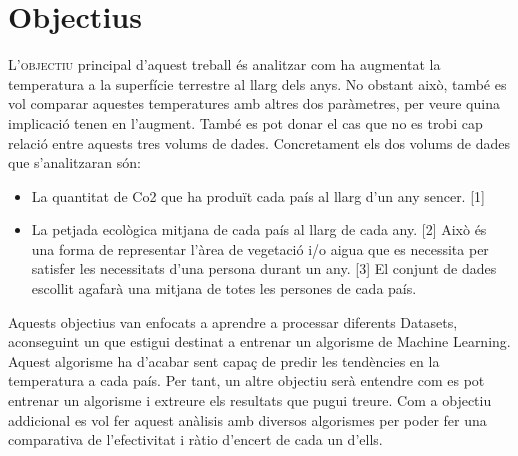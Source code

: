 \documentclass[10pt,a4paper,twocolumn,twoside]{article}
\begin{document}
\section{Objectius}
\lettrine[lines=3]{L}{'objectiu} principal d'aquest treball és analitzar com ha augmentat la temperatura a la superfície terrestre al llarg dels anys. No obstant això, també es vol comparar aquestes temperatures amb altres dos paràmetres, per veure quina implicació tenen en l'augment. També es pot donar el cas que no es trobi cap relació entre aquests tres volums de dades. Concretament els dos volums de dades que s'analitzaran són:
\begin{itemize}
\item La quantitat de Co2 que ha produït cada país al llarg d’un any sencer. [1]
\item La petjada ecològica mitjana de cada país al llarg de cada any. [2] Això és una forma de representar l'àrea de vegetació i/o aigua que es necessita per satisfer les necessitats d'una persona durant un any. [3] El conjunt de dades escollit agafarà una mitjana de totes les persones de cada país.   
\end{itemize}

Aquests objectius van enfocats a aprendre a processar diferents Datasets, aconseguint un que estigui destinat a entrenar un algorisme de Machine Learning. Aquest algorisme ha d'acabar sent capaç de predir les tendències en la temperatura a cada país. Per tant, un altre objectiu serà entendre com es pot entrenar un algorisme i extreure els resultats que pugui treure. Com a objectiu addicional es vol fer aquest anàlisis amb diversos algorismes per poder fer una comparativa de l'efectivitat i ràtio d'encert de cada un d'ells.
\end{document}
